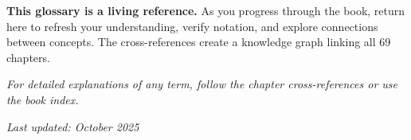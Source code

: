 \begin{keyconcept}
\textbf{This glossary is a living reference.} As you progress through the book, return here to refresh your understanding, verify notation, and explore connections between concepts. The cross-references create a knowledge graph linking all 69 chapters.
\end{keyconcept}

\vspace{1em}
\noindent\emph{For detailed explanations of any term, follow the chapter cross-references or use the book index.}

\vspace{0.5em}
\noindent\emph{Last updated: October 2025}
